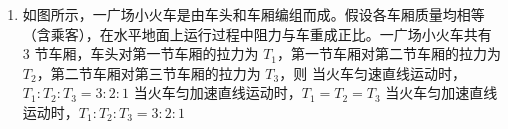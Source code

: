 \documentclass[\gkver]{gaokaozhenti}
\begin{document}
\begin{enumerate}
{ $F \cdot \Delta t = mv_{0} - mv$

根据

 $F = BIL$

 $I = \frac{E}{R}$

 $E = BLv$

可得

 $F = \frac{B^{2}L^{2}v}{R}$

又因为

 $x = v \cdot \Delta t$

联立可得

 $\frac{B^{2}L^{2}}{R}x = mv_{0} - mv$

根据表达式可知 v 与 x 成一次函数关系，故 A 正确，B 错误；

CD. a 克服安培力做功的功率为

$$ P=Fv=\frac{B^{2}L^{2}}{R}\cdot v^{2}=\frac{B^{2}L^{2}}{R}\cdot\left(v_{0}-\frac{B^{2}L^{2}}{mR}x\right)^{2} $$

故 P-x 图像为开口向上的抛物线，由于 F 和 v 都在减小，故 P 在减小，故 CD 错误。故选 A。
}

\item
如图所示，一广场小火车是由车头和车厢编组而成。假设各车厢质量均相等（含乘客），在水平地面上运行过程中阻力与车重成正比。一广场小火车共有 3 节车厢，车头对第一节车厢的拉力为 $T_{1}$，第一节车厢对第二节车厢的拉力为 $T_{2}$，第二节车厢对第三节车厢的拉力为 $T_{3}$，则
{当火车匀速直线运动时，$T_{1} : T_{2} : T_{3} = 3 : 2 : 1$}
{当火车匀加速直线运动时，$T_{1} = T_{2} = T_{3}$}
{当火车匀加速直线运动时，$T_{1} : T_{2} : T_{3} = 3 : 2 : 1$}
\end{enumerate}
\end{document}
